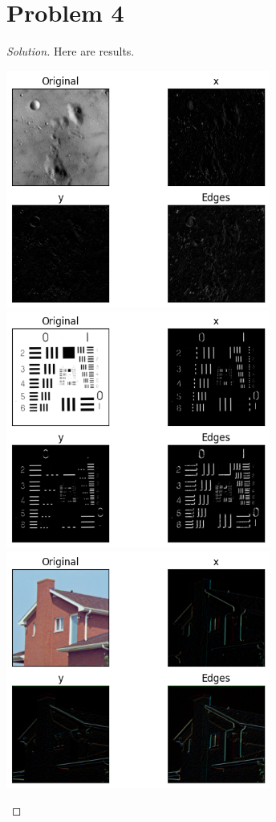 \section*{Problem 4}
	\begin{proof} [Solution]
		Here are results.
		\begin{center}
			\includegraphics[width=0.65\textwidth]{moon.png}
			\includegraphics[width=0.65\textwidth]{resolution_table.png}
			\includegraphics[width=0.65\textwidth]{house.png}

\end{center}
\end{proof}
